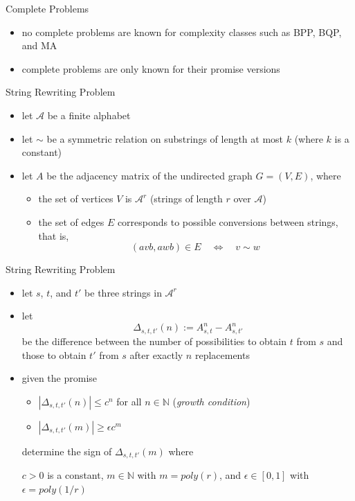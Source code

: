 \documentclass[slideColor]{prosper}
\newcommand{\N}{{\mathbb{N}}}
\newcommand{\cA}{{\mathcal{A}}}
\renewcommand{\>}{\rangle}
\newcommand{\<}{\langle}
\begin{document}

\begin{slide}{Complete Problems}
\begin{itemize}
\item no complete problems are known for complexity classes such as BPP, BQP, and MA
\item complete problems are only known for their promise versions 
\end{itemize}
\end{slide}


\begin{slide}{String Rewriting Problem}

\begin{itemize}
\item let $\cA$ be a finite alphabet

\medskip
\item let $\sim$ be a symmetric relation on substrings of length at most $k$ (where $k$ is a constant)

\medskip
\item let $A$ be the adjacency matrix of the undirected graph $G=(V,E)$, where
\begin{itemize}

\medskip
\item the set of vertices $V$ is $\cA^r$ (strings of length $r$ over $\cA$)

\medskip
\item the set of edges $E$ corresponds to possible conversions between strings, that is,
\[
(avb,awb)\in E \quad \Longleftrightarrow \quad v\sim w\
\]
\end{itemize}
\end{itemize}
\end{slide}


\begin{slide}{String Rewriting Problem}
\begin{itemize}
\item let $s$, $t$, and $t'$ be three strings in $\cA^r$
\item let 
\[
\Delta_{s,t,t'}(n):=A_{s,t}^n - A_{s,t'}^n
\]
be the difference between the number of possibilities to obtain $t$ from $s$ and those to obtain $t'$ from $s$ after exactly $n$ replacements
\item given the promise
\begin{itemize}
\item $|\Delta_{s,t,t'}(n)| \le c^n$ for all $n\in\N$ ({\em growth condition})
\item $|\Delta_{s,t,t'}(m)|\ge \epsilon c^m$
\end{itemize}
determine the sign of $\Delta_{s,t,t'}(m)$ where

$c>0$ is a constant, $m\in\N$ with $m=poly(r)$, and $\epsilon\in [0,1]$ with $\epsilon=poly(1/r)$
\end{itemize}
\end{slide}
\end{document}
